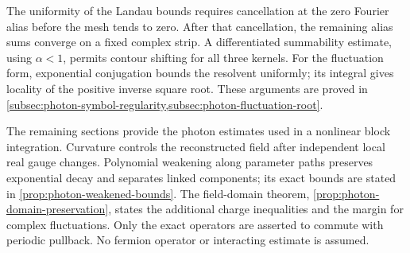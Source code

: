 The uniformity of the Landau bounds requires cancellation at the
zero Fourier alias before the mesh tends to zero. After that
cancellation, the remaining alias sums converge on a fixed complex
strip. A differentiated summability estimate, using \(\alpha<1\),
permits contour shifting for all three kernels. For the
fluctuation form, exponential conjugation bounds the resolvent
uniformly; its integral gives locality of the positive inverse
square root. These arguments are proved in
\cref{subsec:photon-symbol-regularity,subsec:photon-fluctuation-root}.

The remaining sections provide the photon estimates used in a
nonlinear block integration. Curvature controls the reconstructed
field after independent local real gauge changes. Polynomial
weakening along parameter paths preserves exponential decay and
separates linked components; its exact bounds are stated in
\cref{prop:photon-weakened-bounds}. The field-domain theorem,
\cref{prop:photon-domain-preservation}, states the additional
charge inequalities and the margin for complex fluctuations.
Only the exact operators are asserted to commute with periodic
pullback. No fermion operator or interacting estimate is assumed.
